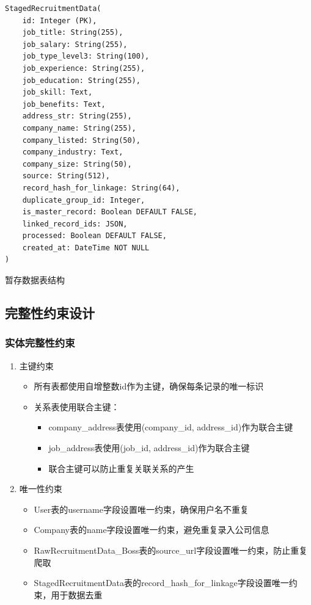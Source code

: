   \begin{listing}[htbp]
    \begin{verbatim}
StagedRecruitmentData(
    id: Integer (PK),
    job_title: String(255),
    job_salary: String(255),
    job_type_level3: String(100),
    job_experience: String(255),
    job_education: String(255),
    job_skill: Text,
    job_benefits: Text,
    address_str: String(255),
    company_name: String(255),
    company_listed: String(50),
    company_industry: Text,
    company_size: String(50),
    source: String(512),
    record_hash_for_linkage: String(64),
    duplicate_group_id: Integer,
    is_master_record: Boolean DEFAULT FALSE,
    linked_record_ids: JSON,
    processed: Boolean DEFAULT FALSE,
    created_at: DateTime NOT NULL
)
    \end{verbatim}
    \caption{暂存数据表结构}\label{lst:staged_data_schema}
  \end{listing}

\subsection{完整性约束设计}

\subsubsection{实体完整性约束}

\begin{enumerate}
  \item 主键约束
  \begin{itemize}
    \item 所有表都使用自增整数id作为主键，确保每条记录的唯一标识
    \item 关系表使用联合主键：
    \begin{itemize}
      \item company\_address表使用(company\_id, address\_id)作为联合主键
      \item job\_address表使用(job\_id, address\_id)作为联合主键
      \item 联合主键可以防止重复关联关系的产生
    \end{itemize}
  \end{itemize}

  \item 唯一性约束
  \begin{itemize}
    \item User表的username字段设置唯一约束，确保用户名不重复
    \item Company表的name字段设置唯一约束，避免重复录入公司信息
    \item RawRecruitmentData\_Boss表的source\_url字段设置唯一约束，防止重复爬取
    \item StagedRecruitmentData表的record\_hash\_for\_linkage字段设置唯一约束，用于数据去重
  \end{itemize}
\end{enumerate}

